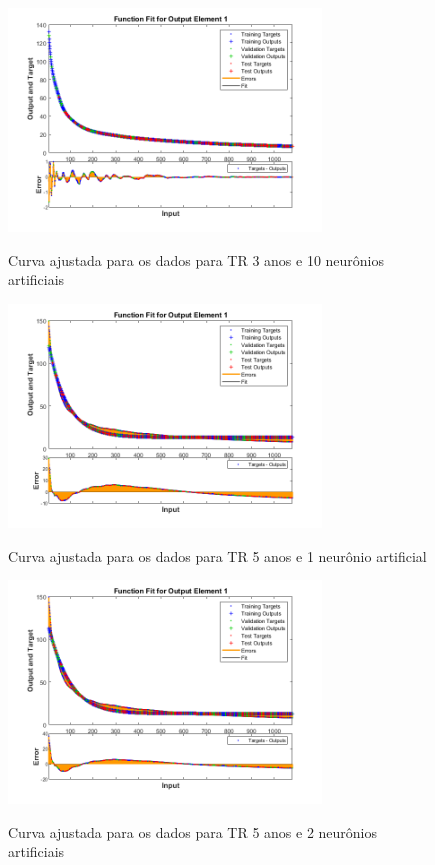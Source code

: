 \begin{figure}[h]
    \caption{Curva ajustada para os dados para TR 3 anos e 10 neurônios artificiais}
    \centering
    \includegraphics[width=0.74\textwidth]{Textuais/Figuras/NN/tr3-10neuronio.png}
    \label{fig:tr3-10n}
\end{figure}

\begin{figure}[h]
    \caption{Curva ajustada para os dados para TR 5 anos e 1 neurônio artificial}
    \centering
    \includegraphics[width=0.74\textwidth]{Textuais/Figuras/NN/tr5-1neuronio.png}
    \label{fig:tr5-1n}
\end{figure}

\begin{figure}[h]
    \caption{Curva ajustada para os dados para TR 5 anos e 2 neurônios artificiais}
    \centering
    \includegraphics[width=0.74\textwidth]{Textuais/Figuras/NN/tr5-2neuronio.png}
    \label{fig:tr5-2n}
\end{figure}

